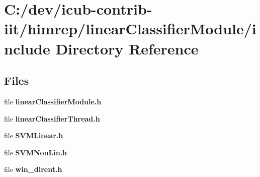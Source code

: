 \section{C\+:/dev/icub-\/contrib-\/iit/himrep/linear\+Classifier\+Module/include Directory Reference}
\label{dir_35501fdac143fccee38a09bee6c8d2da}
\subsection*{Files}
\begin{DoxyCompactItemize}
\item 
file {\bfseries linear\+Classifier\+Module.\+h}
\item 
file {\bfseries linear\+Classifier\+Thread.\+h}
\item 
file {\bfseries S\+V\+M\+Linear.\+h}
\item 
file {\bfseries S\+V\+M\+Non\+Lin.\+h}
\item 
file {\bfseries win\+\_\+dirent.\+h}
\end{DoxyCompactItemize}
